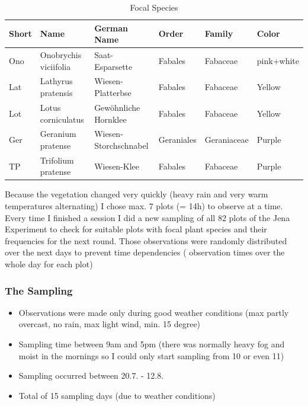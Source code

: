 \begin{table}[htbp]
  \centering
  \caption{Focal Species}
    \begin{tabular}{llllll}
    \toprule
    \textbf{Short} & \textbf{Name} & \textbf{German Name} & \textbf{Order} & \textbf{Family} & \textbf{Color} \\
    \midrule
    Ono   & Onobrychis viciifolia & Saat-Esparsette & Fabales & Fabaceae & pink+white \\
    Lat   & Lathyrus pratensis & Wiesen-Platterbse & Fabales & Fabaceae & Yellow \\
    Lot   & Lotus corniculatus & Gewöhnliche Hornklee & Fabales & Fabaceae & Yellow \\
    Ger   & Geranium pratense & Wiesen-Storchschnabel & Geraniales & Geraniaceae & Purple \\
    TP    & Trifolium pratense & Wiesen-Klee & Fabales & Fabaceae & Purple \\
    \bottomrule
    \end{tabular}%
\end{table}%


Because the vegetation changed very quickly (heavy rain and very warm temperatures alternating) I chose max. 7 plots (= 14h) to observe at a time. 
Every time I finished a session I did a new sampling of all 82 plots of the Jena Experiment to check for suitable plots with focal plant species and their frequencies for the next round. Those observations were randomly distributed over the next days to prevent time dependencies ( observation times over the whole day for each plot)


\subsubsection{The Sampling}

\begin{itemize}
\item	Observations were made only during good weather conditions (max partly overcast, no rain, max light wind, min. 15 degree)
\item	Sampling time between 9am and 5pm (there was normally heavy fog and moist in the mornings so I could only start sampling from 10 or even 11)
\item	Sampling occurred between 20.7. -  12.8. 
\item Total of 15 sampling days (due to weather conditions)
\end{itemize}



